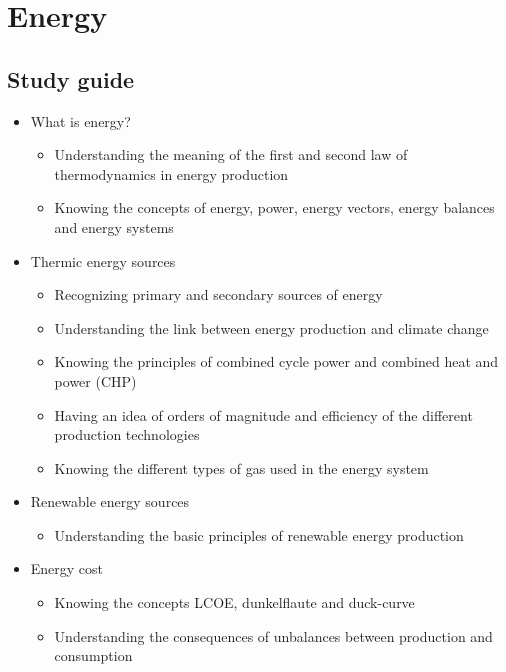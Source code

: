 \documentclass[../summary.tex]{subfiles}
\begin{document}
	
	\section{Energy}
	
	\subsection{Study guide}
	\begin{itemize} 
		\setlength{\itemsep}{0pt}
		
		\item What is energy?
		\begin{itemize}
			\item Understanding the meaning of the first and second law of thermodynamics in energy production
			\item Knowing the concepts of energy, power, energy vectors, energy balances and energy systems
		\end{itemize}
		
		\item Thermic energy sources
		\begin{itemize}
			\item Recognizing primary and secondary sources of energy
			\item Understanding the link between energy production and climate change
			\item Knowing the principles of combined cycle power and combined heat and power (CHP)
			\item Having an idea of orders of magnitude and efficiency of the different production technologies
			\item Knowing the different types of gas used in the energy system
		\end{itemize}
		
		\item Renewable energy sources
		\begin{itemize}
			\item Understanding the basic principles of renewable energy production
		\end{itemize}
		
		\item Energy cost
		\begin{itemize}
			\item Knowing the concepts LCOE, dunkelflaute and duck-curve
			\item Understanding the consequences of unbalances between production and consumption
		\end{itemize}
		

\end{itemize}
\end{document}
